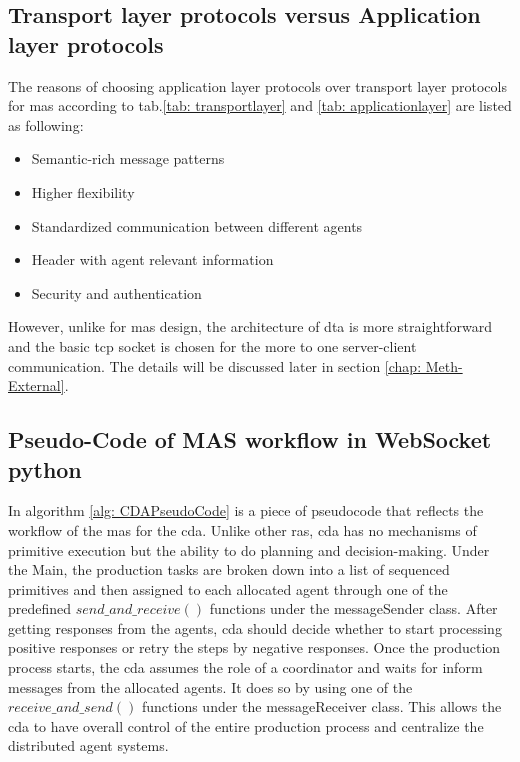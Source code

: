 \subsection{Transport layer protocols versus Application layer protocols}
The reasons of choosing application layer protocols over transport layer protocols for \gls{mas} according to tab.\ref{tab: transportlayer} and \ref{tab: applicationlayer} are listed as following:
\begin{itemize}
    \item Semantic-rich message patterns
    \item Higher flexibility
    \item Standardized communication between different agents
    \item Header with agent relevant information
    \item Security and authentication
    \end{itemize}
However, unlike for \gls{mas} design, the architecture of \gls{dta} is more straightforward and the basic \gls{tcp} socket is chosen for the more to one server-client communication. 
The details will be discussed later in section \ref{chap: Meth-External}.

\subsection{Pseudo-Code of MAS workflow in WebSocket python}\label{chap: Meth-WS-MAS}
In algorithm \ref{alg: CDAPseudoCode} is a piece of pseudocode that reflects the workflow of the \gls{mas} for the \gls{cda}. 
Unlike other \gls{ras}, \gls{cda} has no mechanisms of primitive execution but the ability to do planning and decision-making. 
Under the Main, the production tasks are broken down into a list of sequenced primitives and then assigned to each allocated agent through one of the predefined $send\_and\_receive()$ functions under the messageSender class.
After getting responses from the agents, \gls{cda} should decide whether to start processing positive responses or retry the steps by negative responses.  
Once the production process starts, the \gls{cda} assumes the role of a coordinator and waits for inform messages from the allocated agents. It does so by using one of the $receive\_and\_send()$ functions under the messageReceiver class. This allows the \gls{cda} to have overall control of the entire production process and centralize the distributed agent systems.



